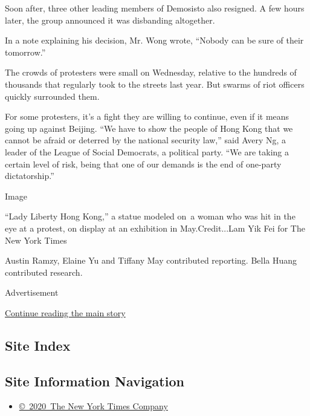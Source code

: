 Soon after, three other leading members of Demosisto also resigned. A
few hours later, the group announced it was disbanding altogether.

In a note explaining his decision, Mr. Wong wrote, ``Nobody can be sure
of their tomorrow.''

The crowds of protesters were small on Wednesday, relative to the
hundreds of thousands that regularly took to the streets last year. But
swarms of riot officers quickly surrounded them.

For some protesters, it's a fight they are willing to continue, even if
it means going up against Beijing. ``We have to show the people of Hong
Kong that we cannot be afraid or deterred by the national security
law,'' said Avery Ng, a leader of the League of Social Democrats, a
political party. ``We are taking a certain level of risk, being that one
of our demands is the end of one-party dictatorship.''

Image

``Lady Liberty Hong Kong,'' a statue modeled on~a woman who was hit in
the eye at a protest, on display at an exhibition in May.Credit...Lam
Yik Fei for The New York Times

Austin Ramzy, Elaine Yu and Tiffany May contributed reporting. Bella
Huang contributed research.

Advertisement

\protect\hyperlink{after-bottom}{Continue reading the main story}

\hypertarget{site-index}{%
\subsection{Site Index}\label{site-index}}

\hypertarget{site-information-navigation}{%
\subsection{Site Information
Navigation}\label{site-information-navigation}}

\begin{itemize}
\tightlist
\item
  \href{https://help.nytimes.com/hc/en-us/articles/115014792127-Copyright-notice}{©~2020~The
  New York Times Company}
\end{itemize}

